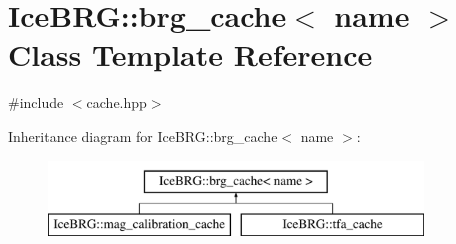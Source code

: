 \hypertarget{classIceBRG_1_1brg__cache}{}\section{Ice\+B\+R\+G\+:\+:brg\+\_\+cache$<$ name $>$ Class Template Reference}
\label{classIceBRG_1_1brg__cache}


{\ttfamily \#include $<$cache.\+hpp$>$}

Inheritance diagram for Ice\+B\+R\+G\+:\+:brg\+\_\+cache$<$ name $>$\+:\begin{figure}[H]
\begin{center}
\leavevmode
\includegraphics[height=2.000000cm]{classIceBRG_1_1brg__cache}
\end{center}
\end{figure}
